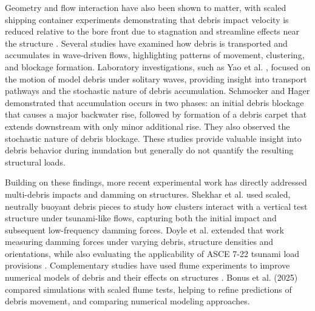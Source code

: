 \documentclass{article}
\begin{document}
Geometry and flow interaction have also been shown to matter, with scaled shipping container experiments demonstrating that debris impact velocity is reduced relative to the bore front due to stagnation and streamline effects near the structure \citep{Derschum2018}. Several studies have examined how debris is transported and accumulates in wave-driven flows, highlighting patterns of movement, clustering, and blockage formation. Laboratory investigations, such as Yao et al. \citep{Yao2014}, focused on the motion of model debris under solitary waves, providing insight into transport pathways and the stochastic nature of debris accumulation. Schmocker and Hager \citep{Schmocker2011}  demonstrated that accumulation occurs in two phases: an initial debris blockage that causes a major backwater rise, followed by formation of a debris carpet that extends downstream with only minor additional rise. They also observed the stochastic nature of debris blockage. These studies provide valuable insight into debris behavior during inundation but generally do not quantify the resulting structural loads.

Building on these findings, more recent experimental work has directly addressed multi-debris impacts and damming on structures. Shekhar et al. \citep{Shekhar2020} used scaled, neutrally buoyant debris pieces to study how  clusters interact with a vertical test structure under tsunami-like flows, capturing both the initial impact and subsequent low-frequency damming forces. Doyle et al. extended that work measuring damming forces under varying debris, structure densities and orientations, while also evaluating the applicability of ASCE 7-22 tsunami load provisions \citep{Doyle2024}. Complementary studies have used flume experiments to improve numerical models of debris and their effects on structures \citep{Bonus2022, bonusTsunamiDebrisMotion2025}. Bonus et al. (2025) compared simulations with scaled flume tests, helping to refine predictions of debris movement, and comparing numerical modeling approaches.
\end{document}
